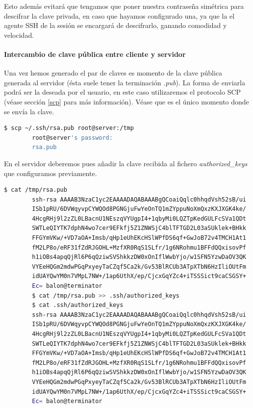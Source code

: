 \documentclass[a4paper, 11pt, titlepage]{book}
\begin{document}
                Esto además evitará que tengamos que poner nuestra contraseña simétrica 
                para descifrar la clave privada, en caso que hayamos configurado una, ya que la 
                el agente SSH de la sesión se encargará de descifrarlo, ganando comodidad y velocidad.
    
                \paragraph{Intercambio de clave pública entre cliente y servidor} Una vez hemos 
                generado el par de claves es momento de la clave pública generada al servidor 
                (ésta suele tener la terminación \textit{.pub}). La forma de enviarla podrá ser 
                la deseada por el usuario, en este caso utilizaremos el protocolo SCP (véase 
                sección \ref{scp} para más información). Véase que es el único momento donde se 
                envía la clave.
                
                \begin{lstlisting}[language=bash]
        $ scp ~/.ssh/rsa.pub root@server:/tmp
        root@server's password:
        rsa.pub \end{lstlisting}
    
                En el servidor deberemos pues añadir la clave recibida al fichero \textit{authorized\_keys}
                que configuramos previamente.
                
                \begin{lstlisting}[language=bash,basicstyle=\scriptsize]
        $ cat /tmp/rsa.pub
        ssh-rsa AAAAB3NzaC1yc2EAAAADAQABAAABgQCoaiQqlc0hhqdVsh52sB/ui
        ISb1pRU/6DVWqyvpCYWQOd8PGNGjuFwYeOnTQ1mZYppuNoXmQxzKXJXGK4ke/
        4HcgRHj9l2zZL0LBacnU1NEszqVYUgpI4+1qbyMi0LQZTpKedGULFcSVa1QDt
        SWTLeQIYTK7dphN4wo7cer9EFkfj5Z1ZNWSjC4blTFTGD2L03aSUklek+BHkk
        FFGYmVKw/+VD7aOA+Imsb/qHp1eUhEKcHSlWPfDS6qf+GwJoB72v4TMCH1At1
        fM2LP8o/eRF31fZdRJGOHL+MzfXR0RqS1SLfr/1g6NRohmu1BFFdQQxisovPf
        h1iOBs4apqQjRl6P6qQziwSVShkkzDW0xOnIflWwbYjo/w1SFN5YzwDaOV3QK
        VYEeHQGm2mdwPGqPxyeyTaCZqf5Ca2k/Gv53BlRCUb3ATpXTbN6HzIliOUtFm
        idUAYQwYM0n7VMpL7NW+/1ap6UthX/ep/CjcxGqYZc4+iTSSSict9caCSGSY+
        Ec= balon@terminator
        $ cat /tmp/rsa.pub >> .ssh/authorized_keys
        $ cat .ssh/authorized_keys
        ssh-rsa AAAAB3NzaC1yc2EAAAADAQABAAABgQCoaiQqlc0hhqdVsh52sB/ui
        ISb1pRU/6DVWqyvpCYWQOd8PGNGjuFwYeOnTQ1mZYppuNoXmQxzKXJXGK4ke/
        4HcgRHj9l2zZL0LBacnU1NEszqVYUgpI4+1qbyMi0LQZTpKedGULFcSVa1QDt
        SWTLeQIYTK7dphN4wo7cer9EFkfj5Z1ZNWSjC4blTFTGD2L03aSUklek+BHkk
        FFGYmVKw/+VD7aOA+Imsb/qHp1eUhEKcHSlWPfDS6qf+GwJoB72v4TMCH1At1
        fM2LP8o/eRF31fZdRJGOHL+MzfXR0RqS1SLfr/1g6NRohmu1BFFdQQxisovPf
        h1iOBs4apqQjRl6P6qQziwSVShkkzDW0xOnIflWwbYjo/w1SFN5YzwDaOV3QK
        VYEeHQGm2mdwPGqPxyeyTaCZqf5Ca2k/Gv53BlRCUb3ATpXTbN6HzIliOUtFm
        idUAYQwYM0n7VMpL7NW+/1ap6UthX/ep/CjcxGqYZc4+iTSSSict9caCSGSY+
        Ec= balon@terminator\end{lstlisting}
                
\end{document}
